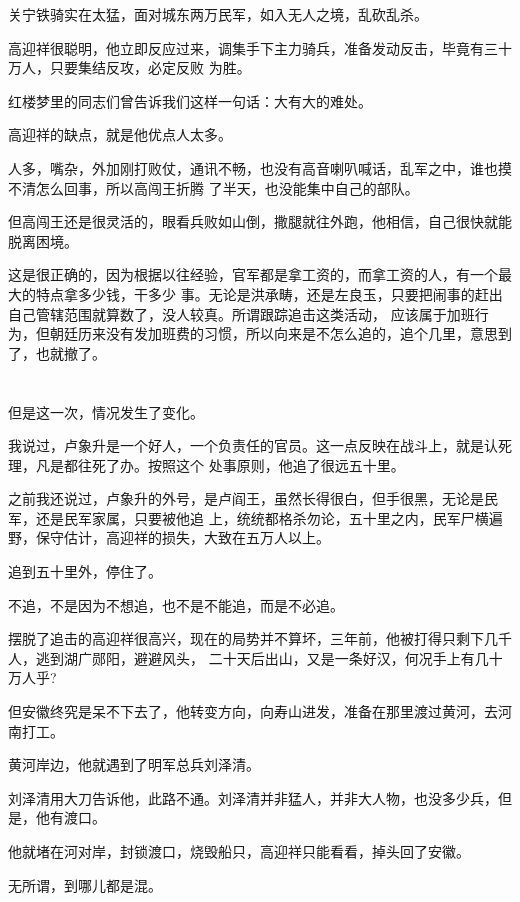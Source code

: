 \documentclass[11pt,a4paper,onecolumn]{article}
\begin{document}
关宁铁骑实在太猛，面对城东两万民军，如入无人之境，乱砍乱杀。

高迎祥很聪明，他立即反应过来，调集手下主力骑兵，准备发动反击，毕竟有三十万人，只要集结反攻，必定反败
为胜。

红楼梦里的同志们曾告诉我们这样一句话：大有大的难处。

高迎祥的缺点，就是他优点\myrule 人太多。

人多，嘴杂，外加刚打败仗，通讯不畅，也没有高音喇叭喊话，乱军之中，谁也摸不清怎么回事，所以高闯王折腾
了半天，也没能集中自己的部队。

但高闯王还是很灵活的，眼看兵败如山倒，撒腿就往外跑，他相信，自己很快就能脱离困境。

这是很正确的，因为根据以往经验，官军都是拿工资的，而拿工资的人，有一个最大的特点\myrule 拿多少钱，干多少
事。无论是洪承畴，还是左良玉，只要把闹事的赶出自己管辖范围就算数了，没人较真。所谓跟踪追击这类活动，
应该属于加班行为，但朝廷历来没有发加班费的习惯，所以向来是不怎么追的，追个几里，意思到了，也就撤了。

\section[\thesection]{}

但是这一次，情况发生了变化。

我说过，卢象升是一个好人，一个负责任的官员。这一点反映在战斗上，就是认死理，凡是都往死了办。按照这个
处事原则，他追了很远\myrule 五十里。

之前我还说过，卢象升的外号，是卢阎王，虽然长得很白，但手很黑，无论是民军，还是民军家属，只要被他追
上，统统都格杀勿论，五十里之内，民军尸横遍野，保守估计，高迎祥的损失，大致在五万人以上。

追到五十里外，停住了。

不追，不是因为不想追，也不是不能追，而是不必追。

摆脱了追击的高迎祥很高兴，现在的局势并不算坏，三年前，他被打得只剩下几千人，逃到湖广郧阳，避避风头，
二十天后出山，又是一条好汉，何况手上有几十万人乎?

但安徽终究是呆不下去了，他转变方向，向寿山进发，准备在那里渡过黄河，去河南打工。

黄河岸边，他就遇到了明军总兵刘泽清。

刘泽清用大刀告诉他，此路不通。刘泽清并非猛人，并非大人物，也没多少兵，但是，他有渡口。

他就堵在河对岸，封锁渡口，烧毁船只，高迎祥只能看看，掉头回了安徽。

无所谓，到哪儿都是混。
\end{document}
